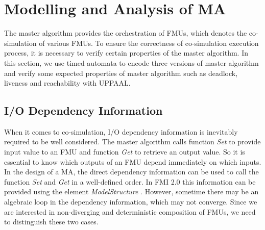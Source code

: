 \section{Modelling and Analysis of MA}
\label{sec:ma}
The master algorithm provides the orchestration of FMUs, which denotes the co-simulation of various FMUs. To ensure the correctness of co-simulation execution process, it is necessary to verify certain properties of the master algorithm. In this section, we use timed automata to encode three versions of master algorithm and verify some expected properties of master algorithm such as deadlock, liveness and reachability with UPPAAL.
\subsection{I/O Dependency Information}
When it comes to co-simulation, I/O dependency information \cite{BromanBGLMTW13} is inevitably required to be well considered. The master algorithm calls function \emph{Set} to provide input value to an FMU and function \emph{Get} to retrieve an output value. So it is essential to know which outputs of an FMU depend immediately on which inputs. In the design of a MA, the direct dependency information can be used to call the function \emph{Set} and \emph{Get} in a well-defined order. In FMI 2.0 this information can be provided using the element \emph{ModelStructure} \cite{FMI2INTRO}. However, sometime there may be an algebraic loop in the dependency information, which may not converge. Since we are interested in non-diverging and deterministic composition of FMUs, we need to distinguish these two cases. 
